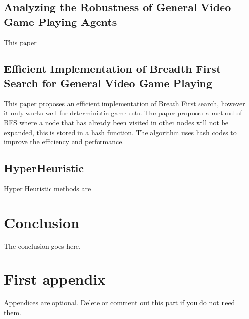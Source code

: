 \documentclass[journal]{IEEEtran}
\begin{document}
\subsection{Analyzing the Robustness of General Video Game Playing Agents}
This paper 
\cite{perez2016analyzing}

\subsection{Efficient Implementation of Breadth First Search for General Video Game Playing}
This paper proposes an efficient implementation of Breath First search, however it only works well for deterministic game sets.
The paper proposes a method of BFS where a node that has already been visited in other nodes will not be expanded, this is stored in a hash function.
The algorithm uses hash codes to improve the efficiency and performance.

\cite{EfficientBFS}

\subsection{HyperHeuristic}
Hyper Heuristic methods are 
\cite{hyperHeurisicMendes}

\section{Conclusion}
The conclusion goes here.






\appendices
\section{First appendix}
Appendices are optional. Delete or comment out this part if you do not need them.

\end{document}
